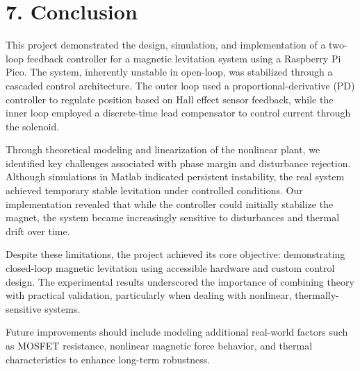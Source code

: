 \documentclass[12pt]{article}
\begin{document}
\section*{7. Conclusion}

This project demonstrated the design, simulation, and implementation of a two-loop feedback controller for a magnetic levitation system using a Raspberry Pi Pico. The system, inherently unstable in open-loop, was stabilized through a cascaded control architecture. The outer loop used a proportional-derivative (PD) controller to regulate position based on Hall effect sensor feedback, while the inner loop employed a discrete-time lead compensator to control current through the solenoid.

Through theoretical modeling and linearization of the nonlinear plant, we identified key challenges associated with phase margin and disturbance rejection. Although simulations in Matlab indicated persistent instability, the real system achieved temporary stable levitation under controlled conditions. Our implementation revealed that while the controller could initially stabilize the magnet, the system became increasingly sensitive to disturbances and thermal drift over time.

Despite these limitations, the project achieved its core objective: demonstrating closed-loop magnetic levitation using accessible hardware and custom control design. The experimental results underscored the importance of combining theory with practical validation, particularly when dealing with nonlinear, thermally-sensitive systems.

Future improvements should include modeling additional real-world factors such as MOSFET resistance, nonlinear magnetic force behavior, and thermal characteristics to enhance long-term robustness.
\end{document}
